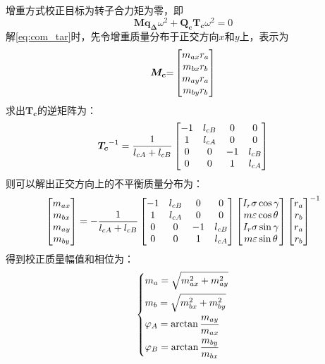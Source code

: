 \documentclass[
  lang=cn,
  degree=master,
  openany,oneside
]{nuaathesis}
\begin{document}
增重方式校正目标为转子合力矩为零，即
\begin{equation}
\label{eq:com_tar}
\boldsymbol{M}\boldsymbol{q_{\Delta}}{\omega}^2 + \boldsymbol{Q_c}\boldsymbol{T_c}{\omega}^2 = 0
\end{equation}
解\autoref{eq:com_tar}时，先令增重质量分布于正交方向$x$和$y$上，表示为
\begin{equation}
{\boldsymbol{M_c}}{\rm{ = }}\left[ {\begin{matrix}
   {{m_{ax}}{r_a}}  \cr 
   {{m_{bx}}{r_b}}  \cr 
   {{m_{ay}}{r_a}}  \cr 
   {{m_{by}}{r_b}}  \cr 

 \end{matrix} } \right]
\end{equation}
求出$\boldsymbol{T_c}$的逆矩阵为：
\begin{equation}
{\boldsymbol{T_c}}^{ - 1} = {1 \over {{l_{cA}} + {l_{cB}}}}\left[ {\begin{matrix}
   { - 1} & {{l_{cB}}} & 0 & 0  \cr 
   1 & {{l_{cA}}} & 0 & 0  \cr 
   0 & 0 & { - 1} & {{l_{cB}}}  \cr 
   0 & 0 & 1 & {{l_{cA}}}  \cr 

 \end{matrix} } \right]
\end{equation}
则可以解出正交方向上的不平衡质量分布为：
\begin{equation}
\left[ {\begin{matrix}
   {{m_{ax}}}  \cr 
   {{m_{bx}}}  \cr 
   {{m_{ay}}}  \cr 
   {{m_{by}}}  \cr 

 \end{matrix} } \right] =  - {1 \over {{l_{cA}} + {l_{cB}}}}\left[ {\begin{matrix}
   { - 1} & {{l_{cB}}} & 0 & 0  \cr 
   1 & {{l_{cA}}} & 0 & 0  \cr 
   0 & 0 & { - 1} & {{l_{cB}}}  \cr 
   0 & 0 & 1 & {{l_{cA}}}  \cr 

 \end{matrix} } \right]\left[ {\begin{matrix}
   {{I_r}\sigma \cos \gamma }  \cr 
   {m\varepsilon \cos \theta }  \cr 
   {{I_r}\sigma \sin \gamma }  \cr 
   {m\varepsilon \sin \theta }  \cr 

 \end{matrix} } \right]{\left[ {\begin{matrix}
   {{r_a}}  \cr 
   {{r_b}}  \cr 
   {{r_a}}  \cr 
   {{r_b}}  \cr 

 \end{matrix} } \right]^{ - 1}}
\end{equation}
得到校正质量幅值和相位为：
\begin{equation}
\left\{
\begin{aligned}
&{m_a} = \sqrt {m_{ax}^2 + m_{ay}^2}\\
&{m_b} = \sqrt {m_{bx}^2 + m_{by}^2} \\  
&{\varphi _A} = \arctan {{{m_{ay}}} \over {{m_{ax}}}} \\
&{\varphi _B} = \arctan {{{m_{by}}} \over {{m_{bx}}}} \\ 
\end{aligned}
\right.
\end{equation}
\end{document}
